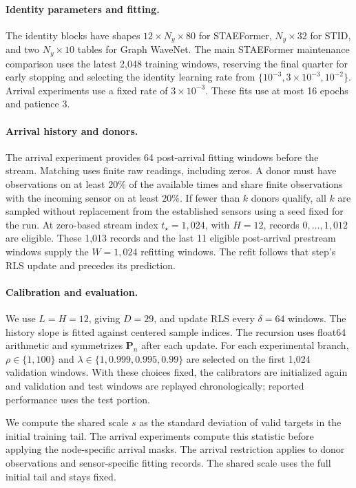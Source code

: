 \paragraph{Identity parameters and fitting.}
The identity blocks have shapes $12\times N_y\times80$ for STAEFormer,
$N_y\times32$ for STID, and two $N_y\times10$ tables for Graph WaveNet.
The main STAEFormer maintenance comparison uses the latest 2,048 training
windows, reserving the final quarter for early stopping and selecting the
identity learning rate from $\{10^{-3},3\times10^{-3},10^{-2}\}$.
Arrival experiments use a fixed rate of $3\times10^{-3}$.
These fits use at most 16 epochs and patience 3.

\paragraph{Arrival history and donors.}
The arrival experiment provides 64 post-arrival fitting windows before
the stream. Matching uses finite raw readings, including zeros.
A donor must have observations on at least $20\%$ of the available times
and share finite observations with the incoming sensor on at least $20\%$.
If fewer than $k$ donors qualify, all $k$ are sampled without replacement
from the established sensors using a seed fixed for the run.
At zero-based stream index $t_\star=1{,}024$, with $H=12$,
records $0,\ldots,1{,}012$ are eligible. These 1,013 records and the last
11 eligible post-arrival prestream windows supply the $W=1{,}024$
refitting windows. The refit follows that step's RLS update and precedes
its prediction.

\paragraph{Calibration and evaluation.}
We use $L=H=12$, giving $D=29$, and update RLS every $\delta=64$ windows.
The history slope is fitted against centered sample indices.
The recursion uses float64 arithmetic and symmetrizes $\mathbf P_n$
after each update.
For each experimental branch, $\rho\in\{1,100\}$ and
$\lambda\in\{1,0.999,0.995,0.99\}$ are selected on the first 1,024
validation windows. With these choices fixed, the calibrators are
initialized again and validation and test windows are replayed
chronologically; reported performance uses the test portion.

We compute the shared scale $s$ as the standard deviation of valid targets
in the initial training tail. The arrival experiments compute this statistic
before applying the node-specific arrival masks.
The arrival restriction applies to donor observations and sensor-specific
fitting records. The shared scale uses the full initial tail and stays fixed.
